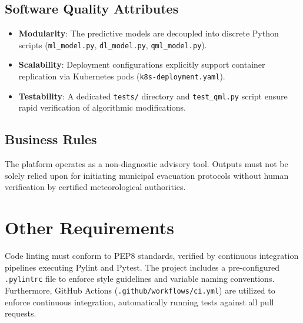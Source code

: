 \documentclass[conference]{IEEEtran}
\begin{document}
\subsection{Software Quality Attributes}
\begin{itemize}
    \item \textbf{Modularity}: The predictive models are decoupled into discrete Python scripts (\texttt{ml\_model.py}, \texttt{dl\_model.py}, \texttt{qml\_model.py}).
    \item \textbf{Scalability}: Deployment configurations explicitly support container replication via Kubernetes pods (\texttt{k8s-deployment.yaml}).
    \item \textbf{Testability}: A dedicated \texttt{tests/} directory and \texttt{test\_qml.py} script ensure rapid verification of algorithmic modifications.
\end{itemize}

\subsection{Business Rules}
The platform operates as a non-diagnostic advisory tool. Outputs must not be solely relied upon for initiating municipal evacuation protocols without human verification by certified meteorological authorities.

\section{Other Requirements}
Code linting must conform to PEP8 standards, verified by continuous integration pipelines executing Pylint and Pytest. The project includes a pre-configured \texttt{.pylintrc} file to enforce style guidelines and variable naming conventions. Furthermore, GitHub Actions (\texttt{.github/workflows/ci.yml}) are utilized to enforce continuous integration, automatically running tests against all pull requests.
\end{document}
